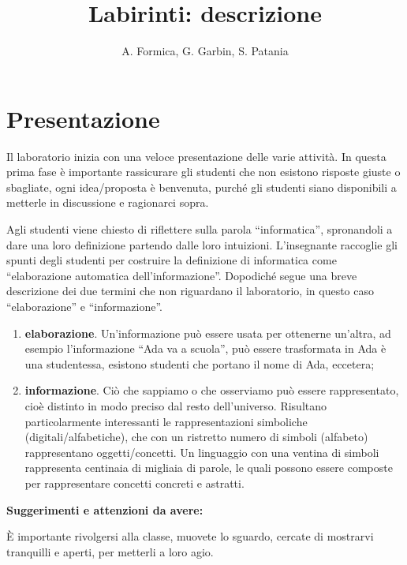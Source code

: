 \documentclass[12pt]{article}
\title{Labirinti: descrizione}
\author{A. Formica, G. Garbin, S. Patania}
\begin{document}
\maketitle
%
% 
\section{Presentazione}
Il laboratorio inizia con una veloce presentazione delle varie attività.
In questa prima fase è importante rassicurare gli studenti che non esistono risposte giuste o sbagliate, ogni idea/proposta è benvenuta, purché gli studenti siano disponibili a metterle in discussione e ragionarci sopra.

Agli studenti viene chiesto di riflettere sulla parola ``informatica'', spronandoli a dare una loro definizione partendo dalle loro intuizioni. L'insegnante raccoglie gli spunti degli studenti per costruire la definizione di informatica come ``elaborazione automatica dell'informazione''. Dopodiché segue una breve descrizione dei due termini che non riguardano il laboratorio, in questo caso ``elaborazione'' e ``informazione''.

\begin{enumerate}
\item \textbf{elaborazione}. Un'informazione può essere usata per ottenerne un'altra, ad esempio  l'informazione ``Ada va a scuola'', può essere trasformata in Ada è una studentessa, esistono studenti che portano il nome di Ada, eccetera;
\item \textbf{informazione}. Ciò che sappiamo o che osserviamo può essere rappresentato, cioè distinto in modo preciso dal resto dell'universo. Risultano particolarmente interessanti le rappresentazioni simboliche (digitali/alfabetiche), che con un ristretto numero di simboli (alfabeto) rappresentano oggetti/concetti. Un linguaggio con una ventina di simboli rappresenta centinaia di migliaia di parole, le quali possono essere composte per rappresentare concetti concreti e astratti.
\end{enumerate}

\textbf{Suggerimenti e attenzioni da avere:}

È importante rivolgersi alla classe, muovete lo sguardo, cercate di mostrarvi tranquilli e aperti, per metterli a loro agio.
\end{document}
